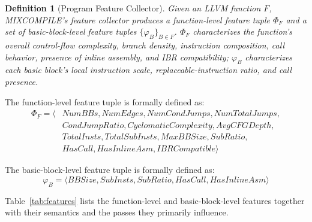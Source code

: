 \documentclass[pdflatex,sn-mathphys-num]{sn-jnl}
\theoremstyle{thmstyleone}%
\theoremstyle{thmstyletwo}%
\theoremstyle{thmstylethree}%
\newtheorem{definition}{Definition}%
\begin{document}
\begin{definition}[Program Feature Collector]
Given an LLVM function $F$, MIXCOMPILE's feature collector produces a function-level feature
tuple $\Phi_F$ and a set of basic-block-level feature tuples $\{\varphi_B\}_{B\in F}$.
$\Phi_F$ characterizes the function's overall control-flow complexity, branch density,
instruction composition, call behavior, presence of inline assembly, and IBR compatibility;
$\varphi_B$ characterizes each basic block's local instruction scale, replaceable-instruction
ratio, and call presence.
\end{definition}

The function-level feature tuple is formally defined as:
\begin{equation}
\begin{aligned}
\Phi_F = \langle & \mathit{NumBBs}, \mathit{NumEdges}, \mathit{NumCondJumps}, \mathit{NumTotalJumps}, \\
                 & \mathit{CondJumpRatio}, \mathit{CyclomaticComplexity}, \mathit{AvgCFGDepth}, \\
                 & \mathit{TotalInsts}, \mathit{TotalSubInsts}, \mathit{MaxBBSize}, \mathit{SubRatio}, \\
                 & \mathit{HasCall}, \mathit{HasInlineAsm}, \mathit{IBRCompatible} \rangle
\end{aligned}
\label{eq:func_features}
\end{equation}

The basic-block-level feature tuple is formally defined as:
\begin{equation}
\varphi_B = \langle \mathit{BBSize}, \mathit{SubInsts}, \mathit{SubRatio}, \mathit{HasCall}, \mathit{HasInlineAsm} \rangle
\label{eq:bb_features}
\end{equation}

Table~\ref{tab:features} lists the function-level and basic-block-level features together
with their semantics and the passes they primarily influence.
\end{document}
